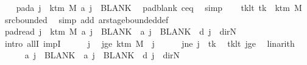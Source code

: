 \begin{isabellebody}
\ \ \isamarkupfalse%
\ pad{\isacharunderscore}{\kern0pt}a{\isacharcolon}{\kern0pt}\ {\isachardoublequoteopen}{\isasymforall}j\ {\isasymge}\ k{\isacharunderscore}{\kern0pt}tm\ M{\isachardot}{\kern0pt}\ {\isacharquery}{\kern0pt}a\ j\ {\isacharequal}{\kern0pt}\ BLANK{}{\isachardoublequoteclose}\ \isamarkupfalse%
\ pad{\isacharunderscore}{\kern0pt}blank\ c{\isacharprime}{\kern0pt}{\isacharunderscore}{\kern0pt}eq\ \isamarkupfalse%
\ simp\isanewline
\ \ \isamarkupfalse%
\ tk{\isacharunderscore}{\kern0pt}lt{\isacharcolon}{\kern0pt}\ {\isachardoublequoteopen}tk\ {\isacharless}{\kern0pt}\ k{\isacharunderscore}{\kern0pt}tm\ M{\isachardoublequoteclose}\ \isamarkupfalse%
\ src{\isacharunderscore}{\kern0pt}bounded\ \isamarkupfalse%
\ {\isacharparenleft}{\kern0pt}simp\ add{\isacharcolon}{\kern0pt}\ ar{\isacharunderscore}{\kern0pt}stage{\isacharunderscore}{\kern0pt}bounded{\isacharunderscore}{\kern0pt}def{\isacharparenright}{\kern0pt}\isanewline
\ \ \isamarkupfalse%
\ pad{\isacharunderscore}{\kern0pt}read{\isacharcolon}{\kern0pt}\ {\isachardoublequoteopen}{\isasymforall}j\ {\isasymge}\ k{\isacharunderscore}{\kern0pt}tm\ M{\isachardot}{\kern0pt}\ {\isacharquery}{\kern0pt}a\ j\ {\isacharequal}{\kern0pt}\ BLANK{}\ {\isasymand}\ {\isacharquery}{\kern0pt}a{\isacharprime}{\kern0pt}\ j\ {\isacharequal}{\kern0pt}\ BLANK{}\ {\isasymand}\ {\isacharquery}{\kern0pt}d\ j\ {\isacharequal}{\kern0pt}\ dir{\isachardot}{\kern0pt}N{\isachardoublequoteclose}\isanewline
\ \ \isamarkupfalse%
\ {\isacharparenleft}{\kern0pt}intro\ allI\ impI{\isacharparenright}{\kern0pt}\isanewline
\ \ \ \ \isamarkupfalse%
\ j\ \isamarkupfalse%
\ jge{\isacharcolon}{\kern0pt}\ {\isachardoublequoteopen}k{\isacharunderscore}{\kern0pt}tm\ M\ {\isasymle}\ j{\isachardoublequoteclose}\isanewline
\ \ \ \ \isamarkupfalse%
\ jne{\isacharcolon}{\kern0pt}\ {\isachardoublequoteopen}j\ {\isasymnoteq}\ tk{\isachardoublequoteclose}\ \isamarkupfalse%
\ tk{\isacharunderscore}{\kern0pt}lt\ jge\ \isamarkupfalse%
\ linarith\isanewline
\ \ \ \ \isamarkupfalse%
\ {\isachardoublequoteopen}{\isacharquery}{\kern0pt}a\ j\ {\isacharequal}{\kern0pt}\ BLANK{}\ {\isasymand}\ {\isacharquery}{\kern0pt}a{\isacharprime}{\kern0pt}\ j\ {\isacharequal}{\kern0pt}\ BLANK{}\ {\isasymand}\ {\isacharquery}{\kern0pt}d\ j\ {\isacharequal}{\kern0pt}\ dir{\isachardot}{\kern0pt}N{\isachardoublequoteclose}\isanewline

\end{isabellebody}
